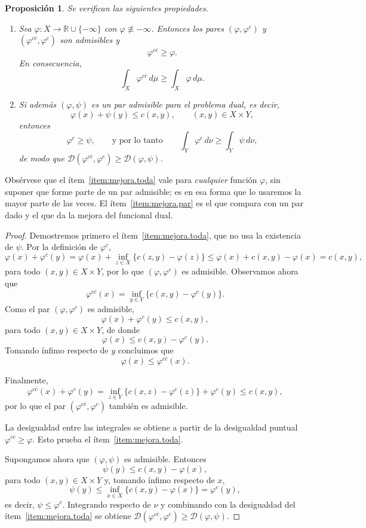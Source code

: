 \documentclass[12pt, a4paper]{amsbook}
\newcommand{\R}{{\mathbb R}}
\newcommand{\D}{{\mathcal D}}
\newtheorem{prop}[teo]{Proposición}
\theoremstyle{remark}
\theoremstyle{definition}
\numberwithin{section}{chapter}
\numberwithin{subsection}{section}
\numberwithin{equation}{section}
\numberwithin{figure}{chapter}
\begin{document}
\begin{prop}\label{prop:mejora-potenciales}
Se verifican las siguientes propiedades.

\begin{enumerate}
\item\label{item:mejora.toda} Sea $\varphi\colon X\to\R\cup\{-\infty\}$ con
$\varphi\not\equiv-\infty$. Entonces los pares $(\varphi,\varphi^c)$ y
$(\varphi^{c\bar c},\varphi^c)$ son admisibles y
\[
\varphi^{c\bar c}\ge\varphi.
\]
En consecuencia,
\[
\int_X\varphi^{c\bar c}\,d\mu
\ge
\int_X\varphi\,d\mu.
\]

\item\label{item:mejora.par} Si además $(\varphi,\psi)$ es un par admisible
para el problema dual, es decir,
\[
\varphi(x)+\psi(y)\le c(x,y),
\qquad
(x,y)\in X\times Y,
\]
entonces
\[
\varphi^c\ge\psi,
\qquad\text{y por lo tanto}\qquad
\int_Y\varphi^c\,d\nu
\ge
\int_Y\psi\,d\nu,
\]
de modo que
$\D(\varphi^{c\bar c},\varphi^c)\ge\D(\varphi,\psi)$.
\end{enumerate}
\end{prop}

Obsérvese que el ítem~\ref{item:mejora.toda} vale para \emph{cualquier}
función $\varphi$, sin suponer que forme parte de un par admisible; es en esa
forma que lo usaremos la mayor parte de las veces. El ítem~\ref{item:mejora.par}
es el que compara con un par dado y el que da la mejora del funcional dual.

\begin{proof}
Demostremos primero el ítem~\ref{item:mejora.toda}, que no usa la existencia
de $\psi$. Por la definición de $\varphi^c$,
\[
\varphi(x)+\varphi^c(y)
=
\varphi(x)
+
\inf_{z\in X}
\{c(z,y)-\varphi(z)\}
\le
\varphi(x)
+
c(x,y)-\varphi(x)
=
c(x,y),
\]
para todo $(x,y)\in X\times Y$, por lo que $(\varphi,\varphi^c)$ es admisible.
Observamos ahora que
\[
\varphi^{c\bar c}(x)
=
\inf_{y\in Y}
\{c(x,y)-\varphi^c(y)\}.
\]
Como el par $(\varphi,\varphi^c)$ es admisible,
\[
\varphi(x)+\varphi^c(y)\le c(x,y),
\]
para todo $(x,y)\in X\times Y$, de donde
\[
\varphi(x)
\le
c(x,y)-\varphi^c(y).
\]
Tomando ínfimo respecto de $y$ concluimos que
\[
\varphi(x)
\le
\varphi^{c\bar c}(x).
\]

Finalmente,
\[
\varphi^{c\bar c}(x)+\varphi^c(y)
=
\inf_{z\in Y}
\{c(x,z)-\varphi^c(z)\}
+
\varphi^c(y)
\le
c(x,y),
\]
por lo que el par
$(\varphi^{c\bar c},\varphi^c)$
también es admisible.

La desigualdad entre las integrales se obtiene a partir de la desigualdad
puntual $\varphi^{c\bar c}\ge\varphi$. Esto prueba el
ítem~\ref{item:mejora.toda}.

Supongamos ahora que $(\varphi,\psi)$ es admisible. Entonces
\[
\psi(y)\le c(x,y)-\varphi(x),
\]
para todo $(x,y)\in X\times Y$ y, tomando ínfimo respecto de $x$,
\[
\psi(y)
\le
\inf_{x\in X}
\{c(x,y)-\varphi(x)\}
=
\varphi^c(y),
\]
es decir, $\psi\le\varphi^c$. Integrando respecto de $\nu$ y combinando con la
desigualdad del ítem~\ref{item:mejora.toda} se obtiene
$\D(\varphi^{c\bar c},\varphi^c)\ge\D(\varphi,\psi)$.
\end{proof}
\end{document}
